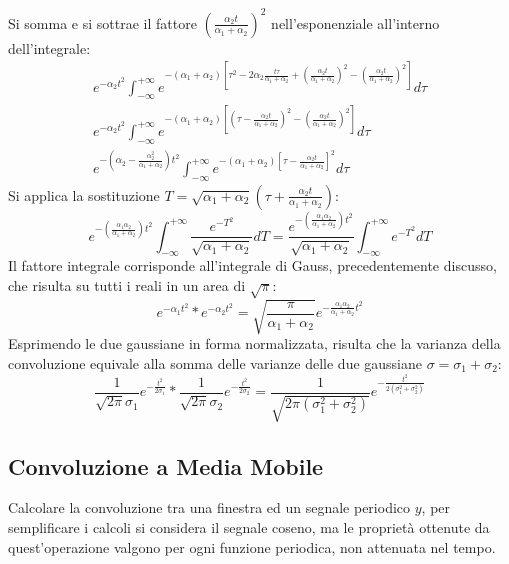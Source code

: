 \documentclass{article}
\numberwithin{equation}{subsection}
\begin{document}
Si somma e si sottrae il fattore $\displaystyle\left(\frac{\alpha_2t}{\alpha_1+\alpha_2}\right)^2$ nell'esponenziale all'interno dell'integrale:
\begin{gather*}
    \displaystyle e^{-\alpha_2 t^2}\int_{-\infty}^{+\infty}e^{-(\alpha_1+\alpha_2)\left[\tau^2-2\alpha_2\frac{t\tau}{\alpha_1+\alpha_2}+\left(\frac{\alpha_2t}{\alpha_1+\alpha_2}\right)^2-\left(\frac{\alpha_2t}{\alpha_1+\alpha_2}\right)^2\right]}d\tau\\
    \displaystyle e^{-\alpha_2 t^2}\int_{-\infty}^{+\infty}e^{-(\alpha_1+\alpha_2)\left[\left(\tau-\frac{\alpha_2t}{\alpha_1+\alpha_2}\right)^2-\left(\frac{\alpha_2t}{\alpha_1+\alpha_2}\right)^2\right]}d\tau\\
    \displaystyle e^{-\left(\alpha_2-\frac{\alpha_2^2}{\alpha_1+\alpha_2}\right)t^2}\int_{-\infty}^{+\infty}e^{-(\alpha_1+\alpha_2)\left[\tau-\frac{\alpha_2t}{\alpha_1+\alpha_2}\right]^2}d\tau
\end{gather*}
Si applica la sostituzione $T=\displaystyle\sqrt{\alpha_1+\alpha_2}\left(\tau+\frac{\alpha_2t}{\alpha_1+\alpha_2}\right)$:
\begin{equation*}
    \displaystyle e^{-\left(\frac{\alpha_1\alpha_2}{\alpha_1+\alpha_2}\right)t^2}\int_{-\infty}^{+\infty}\frac{e^{-T^2}}{\sqrt{\alpha_1+\alpha_2}}dT=\frac{e^{-\left(\frac{\alpha_1\alpha_2}{\alpha_1+\alpha_2}\right)t^2}}{\sqrt{\alpha_1+\alpha_2}}\int_{-\infty}^{+\infty}{e^{-T^2}}dT
\end{equation*}
Il fattore integrale corrisponde all'integrale di Gauss, precedentemente discusso, che risulta su tutti i reali in un area di $\sqrt\pi$:
\begin{equation*}
    e^{-\alpha_1t^2}*e^{-\alpha_2t^2}=\displaystyle\sqrt{\frac{\pi}{\alpha_1+\alpha_2}}e^{-\frac{\alpha_1\alpha_2}{\alpha_1+\alpha_2}t^2}
\end{equation*}
Esprimendo le due gaussiane in forma normalizzata, risulta che la varianza della convoluzione equivale alla somma delle varianze delle due gaussiane $\sigma=\sigma_1+\sigma_2$:
\begin{equation}
    \displaystyle\frac{1}{\sqrt{2\pi}\sigma_1}e^{-\frac{t^2}{2\sigma_1}}*\frac{1}{\sqrt{2\pi}\sigma_2}e^{-\frac{t^2}{2\sigma_2}}=\frac{1}{\sqrt{2\pi(\sigma_1^2+\sigma_2^2)}}e^{-\frac{t^2}{2(\sigma_1^2+\sigma_2^2)}}
\end{equation}

\subsection{Convoluzione a Media Mobile}
Calcolare la convoluzione tra una finestra ed un segnale periodico $y$, 
per semplificare i calcoli si considera il segnale coseno, ma le proprietà ottenute da quest'operazione valgono per ogni funzione periodica, non attenuata nel tempo. 
\end{document}
